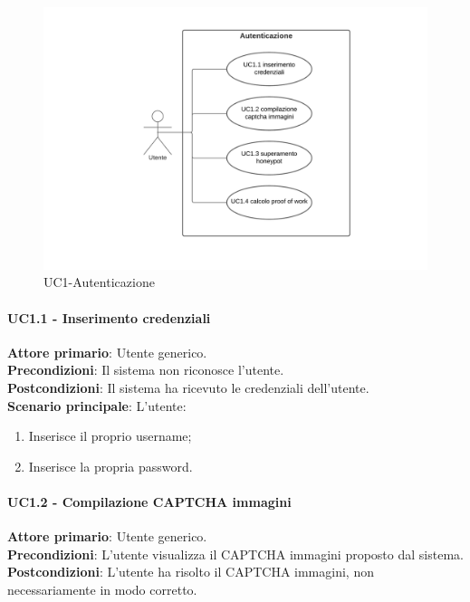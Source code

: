 \begin{figure}[H]
    \centering
    \includegraphics[scale=0.8]{img/Autenticazione.png}
    \caption{UC1-Autenticazione}
\end{figure}

\paragraph{UC1.1 - Inserimento credenziali}
\textbf{Attore primario}: Utente generico.\\
\textbf{Precondizioni}: Il sistema non riconosce l'utente.\\
\textbf{Postcondizioni}: Il sistema ha ricevuto le credenziali dell'utente.\\

\textbf{Scenario principale}: L'utente:
\begin{enumerate}
   \item Inserisce il proprio username;
   \item Inserisce la propria password.
\end{enumerate}

\paragraph{UC1.2 - Compilazione CAPTCHA immagini}
\textbf{Attore primario}: Utente generico.\\
\textbf{Precondizioni}: L'utente visualizza il CAPTCHA immagini proposto dal sistema.\\
\textbf{Postcondizioni}: L'utente ha risolto il CAPTCHA immagini, non necessariamente in modo corretto.\\


